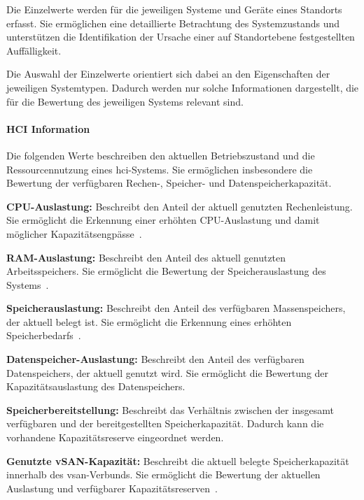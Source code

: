 Die Einzelwerte werden für die jeweiligen Systeme und Geräte eines
Standorts erfasst. Sie ermöglichen eine detaillierte Betrachtung des
Systemzustands und unterstützen die Identifikation der Ursache einer
auf Standortebene festgestellten Auffälligkeit.

Die Auswahl der Einzelwerte orientiert sich dabei an den Eigenschaften
der jeweiligen Systemtypen. Dadurch werden nur solche Informationen
dargestellt, die für die Bewertung des jeweiligen Systems relevant sind.

\paragraph{HCI Information}
\label{par:hci-information}

Die folgenden Werte beschreiben den aktuellen Betriebszustand und die
Ressourcennutzung eines \gls{hci}-Systems. Sie ermöglichen insbesondere
die Bewertung der verfügbaren Rechen-, Speicher- und
Datenspeicherkapazität.

\begin{compactitem}
    \item \textbf{CPU-Auslastung:} Beschreibt den Anteil der aktuell
    genutzten Rechenleistung. Sie ermöglicht die Erkennung einer
    erhöhten CPU-Auslastung und damit möglicher
    Kapazitätsengpässe~\cite{vmware2026vsan}.

    \item \textbf{RAM-Auslastung:} Beschreibt den Anteil des aktuell
    genutzten Arbeitsspeichers. Sie ermöglicht die Bewertung der
    Speicherauslastung des Systems~\cite{vmware2026vsan}.

    \item \textbf{Speicherauslastung:} Beschreibt den Anteil des
    verfügbaren Massenspeichers, der aktuell belegt ist. Sie ermöglicht
    die Erkennung eines erhöhten Speicherbedarfs~\cite{vmware2026vsan}.

    \item \textbf{Datenspeicher-Auslastung:} Beschreibt den Anteil des
    verfügbaren Datenspeichers, der aktuell genutzt wird. Sie ermöglicht
    die Bewertung der Kapazitätsauslastung des Datenspeichers.

    \item \textbf{Speicherbereitstellung:} Beschreibt das Verhältnis
    zwischen der insgesamt verfügbaren und der bereitgestellten
    Speicherkapazität. Dadurch kann die vorhandene Kapazitätsreserve
    eingeordnet werden.

    \item \textbf{Genutzte vSAN-Kapazität:} Beschreibt die aktuell
    belegte Speicherkapazität innerhalb des \gls{vsan}-Verbunds.
    Sie ermöglicht die Bewertung der aktuellen Auslastung und
    verfügbarer Kapazitätsreserven~\cite{vmware2026vsan}.
\end{compactitem}

